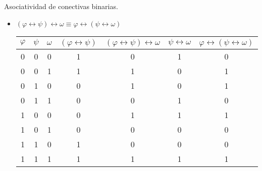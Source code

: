 \begin{example}
	Asociatividad de conectivas binarias.
	\begin{itemize}
		\item \((\varphi \leftrightarrow \psi) \leftrightarrow \omega \equiv \varphi \leftrightarrow (\psi \leftrightarrow \omega )\)

		      \begin{table}[H]
			      \centering
			      \begin{tabular}{|c|c|c|c|c|c|c|}
				      \hline
				      \(\varphi\) & \(\psi \) & \(\omega\) & \((\varphi \leftrightarrow \psi)\) & \((\varphi \leftrightarrow \psi) \leftrightarrow \omega\) & \(\psi \leftrightarrow \omega\) & \(\varphi \leftrightarrow (\psi \leftrightarrow \omega)\) \\ \hline
				      \hline
				      0           & 0         & 0          & 1                                  & 0                                                         & 1                               & 0                                                         \\ \hline
				      0           & 0         & 1          & 1                                  & 1                                                         & 0                               & 1                                                         \\ \hline
				      0           & 1         & 0          & 0                                  & 1                                                         & 0                               & 1                                                         \\ \hline
				      0           & 1         & 1          & 0                                  & 0                                                         & 1                               & 0                                                         \\ \hline
				      1           & 0         & 0          & 0                                  & 1                                                         & 1                               & 1                                                         \\ \hline
				      1           & 0         & 1          & 0                                  & 0                                                         & 0                               & 0                                                         \\ \hline
				      1           & 1         & 0          & 1                                  & 0                                                         & 0                               & 0                                                         \\ \hline
				      1           & 1         & 1          & 1                                  & 1                                                         & 1                               & 1                                                         \\
				      \hline
			      \end{tabular}


\end{table}
\end{itemize}
\end{example}
